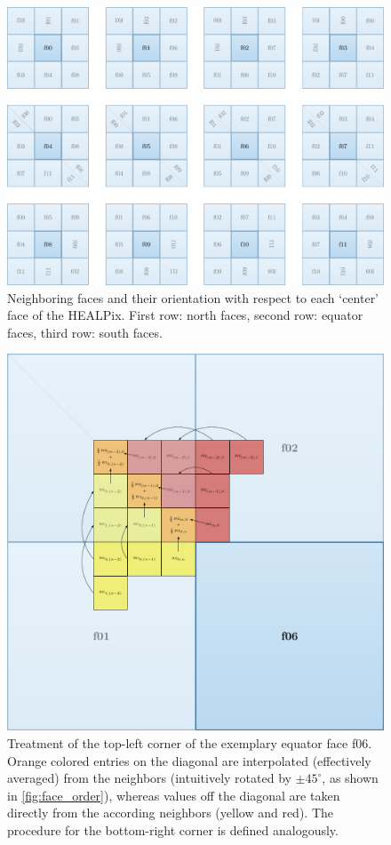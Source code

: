 \documentclass{scrartcl}
\begin{document}
	\begin{figure}
		\includegraphics[width=\linewidth]{pics/padding}
		\caption{Neighboring faces and their orientation with respect to each `center' face of the HEALPix. First row: north faces, second row: equator faces, third row: south faces.}
		\label{fig:padding}
	\end{figure}

	\begin{figure}
		\includegraphics[width=\linewidth]{pics/corners}
		\caption{Treatment of the top-left corner of the exemplary equator face f06. Orange colored entries on the diagonal are interpolated (effectively averaged) from the neighbors (intuitively rotated by $\pm45^\circ$, as shown in \autoref{fig:face_order}), whereas values off the diagonal are taken directly from the according neighbors (yellow and red). The procedure for the bottom-right corner is defined analogously.}
		\label{fig:corners}
	\end{figure}
	  
	
\end{document}
